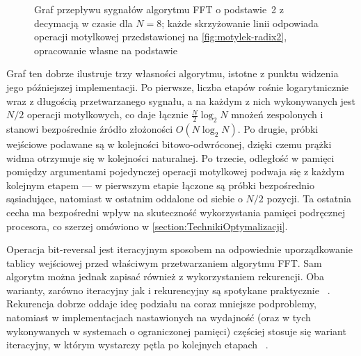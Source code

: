 \begin{figure}[H]
    \caption[Graf przepływu sygnałów algorytmu FFT z decymacją w czasie dla $N = 8$]{Graf przepływu sygnałów algorytmu FFT o podstawie~2 z decymacją w czasie dla $N = 8$; każde skrzyżowanie linii odpowiada operacji motylkowej przedstawionej na \cref{fig:motylek-radix2}, opracowanie własne na podstawie ~\cite{ZielinskiDSP, NumericalRecipesC}}
    \label{fig:graf-fft-8}
\end{figure}

Graf ten dobrze ilustruje trzy własności algorytmu, istotne z punktu widzenia jego późniejszej implementacji. Po pierwsze, liczba etapów rośnie logarytmicznie wraz z długością przetwarzanego sygnału, a na każdym z nich wykonywanych jest $N/2$ operacji motylkowych, co daje łącznie $\frac{N}{2}\log_2 N$ mnożeń zespolonych i stanowi bezpośrednie źródło złożoności $O(N\log_2 N)$. Po drugie, próbki wejściowe podawane są w kolejności bitowo-odwróconej, dzięki czemu prążki widma otrzymuje się w kolejności naturalnej. Po trzecie, odległość w pamięci pomiędzy argumentami pojedynczej operacji motylkowej podwaja się z każdym kolejnym etapem — w pierwszym etapie łączone są próbki bezpośrednio sąsiadujące, natomiast w ostatnim oddalone od siebie o $N/2$ pozycji. Ta ostatnia cecha ma bezpośredni wpływ na skuteczność wykorzystania pamięci podręcznej procesora, co szerzej omówiono w \cref{section:TechnikiOptymalizacji}.

Operacja bit-reversal jest iteracyjnym sposobem na odpowiednie uporządkowanie tablicy wejściowej przed właściwym przetwarzaniem algorytmu FFT. Sam algorytm można jednak zapisać również z wykorzystaniem rekurencji. Oba warianty, zarówno iteracyjny jak i rekurencyjny są spotykane praktycznie ~\cite{NumericalRecipesC}. Rekurencja dobrze oddaje ideę podziału na coraz mniejsze podproblemy, natomiast w implementacjach nastawionych na wydajność (oraz w tych wykonywanych w systemach o ograniczonej pamięci) częściej stosuje się wariant iteracyjny, w którym wystarczy pętla po kolejnych etapach ~\cite{NumericalRecipesC}.


